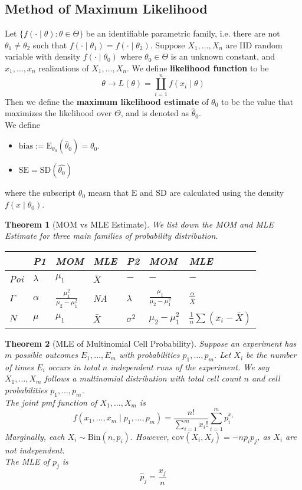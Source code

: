 \documentclass[12pt]{article}
\newcommand{\expec}{\mathrm{E}}
\newcommand{\bin}{\mathrm{Bin}}
\newcommand{\cov}{\mathrm{cov}}
\newtheorem{theorem}{Theorem}[section]
\theoremstyle{definition}
\begin{document}
\subsection{Method of Maximum Likelihood}
Let $\{f(\cdot\mid \theta): \theta\in\Theta\}$ be an identifiable parametric family, i.e. there are not $\theta_1\neq \theta_2$ such that $f(\cdot\mid \theta_1)=f(\cdot\mid \theta_2)$. Suppose $X_1,\ldots, X_n$ are IID random variable with density $f(\cdot\mid \theta_0)$ where $\theta_0\in\Theta$ is an unknown constant, and $x_1,\ldots, x_n$ realizations of $X_1,\ldots, X_n$. We define \textbf{likelihood function} to be
\[
\theta\to L(\theta)=\coprod_{i=1}^n f(x_i\mid \theta)
\]
Then we define the \textbf{maximum likelihood estimate} of $\theta_0$ to be the value that maximizes the likelihood over $\Theta$, and is denoted as $\hat{\theta}_0$.\\
We define 
\begin{itemize}
  \item $\text{bias}:=\expec_{\theta_0}(\hat{\theta}_0)=\theta_0$.
  \item $\text{SE}=\text{SD}(\hat{\theta_0})$
\end{itemize}
where the subscript $\theta_0$ measn that $\expec$ and $\text{SD}$ are calculated using the density $f(x\mid \theta_0)$.
\begin{theorem}[MOM vs MLE Estimate]
\normalfont We list down the MOM and MLE Estimate for three main families of probability distribution.\\
\begin{table}[h]
\centering
\begin{tabular}{|l|l|l|l|l|l|l|}
\hline
&P1& MOM &MLE &P2&MOM &MLE\\\hline
Poi&$\lambda$ & $\mu_1$&$\bar{X}$ & $-$ & $-$ & $-$\\\hline
$\Gamma$ & $\alpha$ & $\frac{\mu_1^2}{\mu_2-\mu_1^2}$ & NA & $\lambda$ &$\frac{\mu_1}{\mu_2-\mu_1^2}$ &$\frac{\alpha}{\bar{X}}$\\\hline
$N$ & $\mu$ & $\mu_1$ & $\bar{X}$ & $\sigma^2$ & $\mu_2-\mu_1^2$ & $\frac{1}{n}\sum(x_i-\bar{X})$\\\hline
\end{tabular}
\end{table}
\end{theorem}
\begin{theorem}[MLE of Multinomial Cell Probability]
\normalfont Suppose an experiment has $m$ possible outcomes $E_1,\ldots, E_m$ with probabilities $p_1,\ldots, p_m$. Let $X_i$ be the number of times $E_i$ occurs in total $n$ independent runs of the experiment.
We say $X_1,\ldots, X_m$ follows a multinomial distribution with total cell count $n$ and cell probabilities $p_1,\ldots, p_m$.\\
The joint pmf function of $X_1,\ldots, X_m$ is
\[
f(x_1,\ldots, x_m\mid p_1,\ldots, p_m) = \frac{n!}{\sum_{i=1}^m x_i!}\sum_{i=1}^m p_i^{x_i}
\]
Marginally, each $X_i\sim \bin(n,p_i)$. However, $\cov(X_i,X_j)=-np_ip_j$, as $X_i$ are not independent.\\
The MLE of $p_j$ is
\[
\hat{p}_j=\frac{x_j}{n}
\]
\end{theorem}
\end{document}
